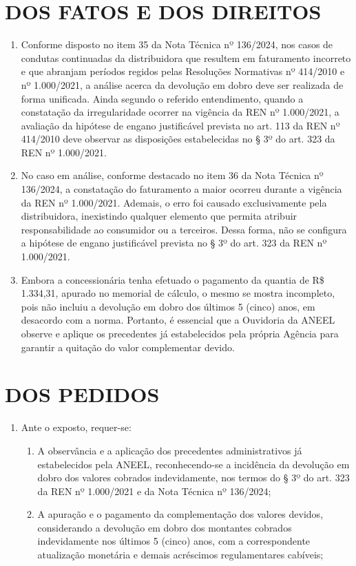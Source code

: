 \newcommand{\tipoRequerimento}{Contestação do memorial de cálculo, pagamento complementar do dobro}

\section{DOS FATOS E DOS DIREITOS}

\begin{enumerate}[resume]
\item Conforme disposto no item 35 da Nota Técnica nº 136/2024, nos casos de condutas continuadas da distribuidora que resultem em faturamento incorreto e que abranjam períodos regidos pelas Resoluções Normativas nº 414/2010 e nº 1.000/2021, a análise acerca da devolução em dobro deve ser realizada de forma unificada. Ainda segundo o referido entendimento, quando a constatação da irregularidade ocorrer na vigência da REN nº 1.000/2021, a avaliação da hipótese de engano justificável prevista no art. 113 da REN nº 414/2010 deve observar as disposições estabelecidas no § 3º do art. 323 da REN nº 1.000/2021.
\item No caso em análise, conforme destacado no item 36 da Nota Técnica nº 136/2024, a constatação do faturamento a maior ocorreu durante a vigência da REN nº 1.000/2021. Ademais, o erro foi causado exclusivamente pela distribuidora, inexistindo qualquer elemento que permita atribuir responsabilidade ao consumidor ou a terceiros. Dessa forma, não se configura a hipótese de engano justificável prevista no § 3º do art. 323 da REN nº 1.000/2021. 
\item Embora a concessionária tenha efetuado o pagamento da quantia de  R\$ 1.334,31, apurado no memorial de cálculo, o mesmo se mostra incompleto, pois não incluiu a devolução em dobro dos últimos 5 (cinco) anos, em desacordo com a norma. Portanto, é essencial que a Ouvidoria da ANEEL observe e aplique os precedentes já estabelecidos pela própria Agência para garantir a quitação do valor complementar devido.
\end{enumerate}

\section{DOS PEDIDOS}

\begin{enumerate}[resume]
\item Ante o exposto, requer-se:
    \begin{enumerate}
    \item A observância e a aplicação dos precedentes administrativos já estabelecidos pela ANEEL, reconhecendo-se a incidência da devolução em dobro dos valores cobrados indevidamente, nos termos do § 3º do art. 323 da REN nº 1.000/2021 e da Nota Técnica nº 136/2024;
    \item A apuração e o pagamento da complementação dos valores devidos, considerando a devolução em dobro dos montantes cobrados indevidamente nos últimos 5 (cinco) anos, com a correspondente atualização monetária e demais acréscimos regulamentares cabíveis;

    \end{enumerate}
\end{enumerate}